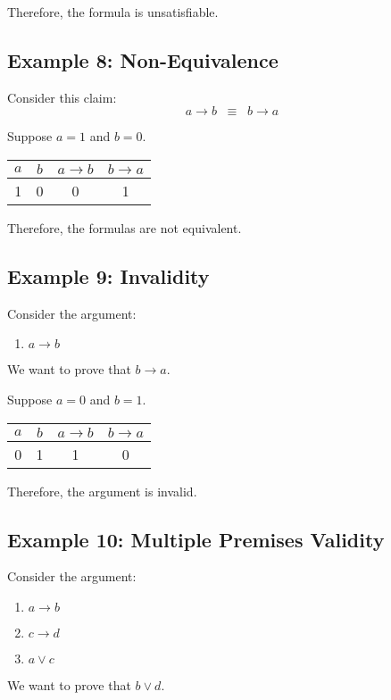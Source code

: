\documentclass[12pt,a4paper,openany]{article}
\begin{document}
Therefore, the formula is unsatisfiable.

\subsection{Example 8: Non-Equivalence}

Consider this claim:
$$ a \to b \;\;\equiv\;\; b \to a $$

Suppose $a = 1$ and $b = 0$.

\begin{center}
\begin{tabular}{|c|c|c|c|}
\hline
$a$ & $b$ & $a \to b$ & $b \to a$ \\
\hline
\textcolor{truecolor}{1} & \textcolor{falsecolor}{0} & \textcolor{falsecolor}{0} & \textcolor{truecolor}{1} \\
\hline
\end{tabular}
\end{center}

Therefore, the formulas are not equivalent.

\subsection{Example 9: Invalidity}

Consider the argument:
\begin{enumerate}
    \item $a \to b$
\end{enumerate}
We want to prove that $b \to a$.

Suppose $a = 0$ and $b = 1$.

\begin{center}
\begin{tabular}{|c|c|c|c|}
\hline
$a$ & $b$ & $a \to b$ & $b \to a$ \\
\hline
\textcolor{falsecolor}{0} & \textcolor{truecolor}{1} & \textcolor{truecolor}{1} & \textcolor{falsecolor}{0} \\
\hline
\end{tabular}
\end{center}

Therefore, the argument is invalid.

\subsection{Example 10: Multiple Premises Validity}

Consider the argument:
\begin{enumerate}
    \item $a \to b$
    \item $c \to d$
    \item $a \lor c$
\end{enumerate}
We want to prove that $b \lor d$.
\end{document}
